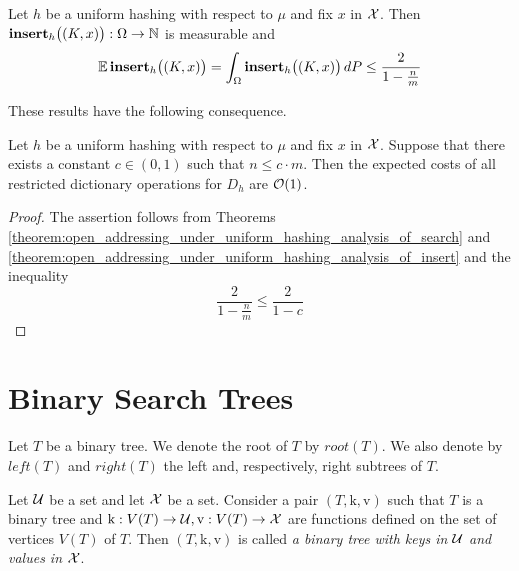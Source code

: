 \begin{theorem}\label{theorem:open_addressing_under_uniform_hashing_analysis_of_insert}
Let $h$ be a uniform hashing with respect to $\mu$ and fix $x$ in ${\mathcal X}$. Then $\mathbf{insert}_h\big((K,x)\big):\Omega \rightarrow {\mathbb N}$ is measurable and
$$\mathbb{E}\,\mathbf{insert}_h\big((K,x)\big) = \int_{\Omega}\mathbf{insert}_h\big((K,x)\big)\,dP \leq \frac{2}{1 - \frac{n}{m}}$$    
\end{theorem}
\noindent
These results have the following consequence.

\begin{corollary}\label{corollary:constant_expected_costs_of_restricted_dictionary_operations_for_uniform_hashing}
Let $h$ be a uniform hashing with respect to $\mu$ and fix $x$ in ${\mathcal X}$. Suppose that there exists a constant $c\in (0,1)$ such that $n\leq c\cdot m$. Then the expected costs of all restricted dictionary operations for $D_h$ are ${\mathcal O}(1)$.
\end{corollary}
\begin{proof}
The assertion follows from Theorems \ref{theorem:open_addressing_under_uniform_hashing_analysis_of_search} and \ref{theorem:open_addressing_under_uniform_hashing_analysis_of_insert} and the inequality 
$$\frac{2}{1 - \frac{n}{m}} \leq \frac{2}{1 - c}$$
\end{proof}

\section{Binary Search Trees}

\begin{notation}\label{notation:notation_for_binary_trees}
Let $T$ be a binary tree. We denote the root of $T$ by $root(T)$. We also denote by $left(T)$ and $right(T)$ the left and, respectively, right subtrees of $T$.
\end{notation}

\begin{definition}
Let ${\mathcal U}$ be a set and let ${\mathcal X}$ be a set. Consider a pair $(T,\mathrm{k},\mathrm{v})$ such that $T$ is a binary tree and $\mathrm{k}:V(T)\rightarrow {\mathcal U},\mathrm{v}:V(T)\rightarrow {\mathcal X}$ are functions defined on the set of vertices $V(T)$ of $T$. Then $(T,\mathrm{k},\mathrm{v})$ is called \textit{a binary tree with keys in ${\mathcal U}$ and values in ${\mathcal X}$}. 
\end{definition}


